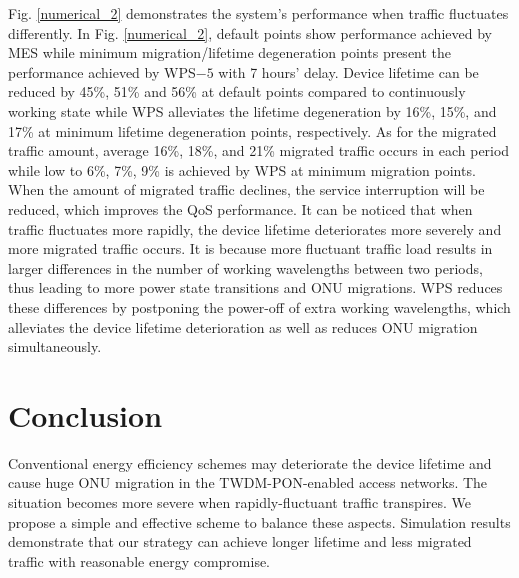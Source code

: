 \documentclass[letter]{IEEEtran}
\begin{document}
Fig. \ref{numerical_2} demonstrates the system's performance when traffic fluctuates differently. In Fig. \ref{numerical_2}, default points show performance achieved by MES while minimum migration/lifetime degeneration points present the performance achieved by WPS$ -5 $ with 7 hours' delay. Device lifetime can be reduced by 45\%, 51\% and 56\% at default points compared to continuously working state while WPS alleviates the lifetime degeneration by 16\%, 15\%, and 17\% at minimum lifetime degeneration points, respectively. As for the migrated traffic amount, average 16\%, 18\%, and 21\% migrated traffic occurs in each period while low to 6\%, 7\%, 9\% is achieved by WPS at minimum migration points. When the amount of migrated traffic declines, the service interruption will be reduced, which improves the QoS performance.
It can be noticed that when traffic fluctuates more rapidly, the device lifetime deteriorates more severely and more migrated traffic occurs. It is because more fluctuant traffic load results in larger differences in the number of working wavelengths between two periods, thus leading to more power state transitions and ONU migrations. WPS reduces these differences by postponing the power-off of extra working wavelengths, which alleviates the device lifetime deterioration as well as reduces ONU migration simultaneously.
\vspace{-3.0mm}

\section{Conclusion}
Conventional energy efficiency schemes may deteriorate the device lifetime and cause huge ONU migration in the TWDM-PON-enabled access networks. The situation becomes more severe when rapidly-fluctuant traffic transpires. We propose a simple and effective scheme to balance these aspects. Simulation results demonstrate that our strategy can achieve longer lifetime and less migrated traffic with reasonable energy compromise.
\vspace{-5.0mm}

\end{document}
